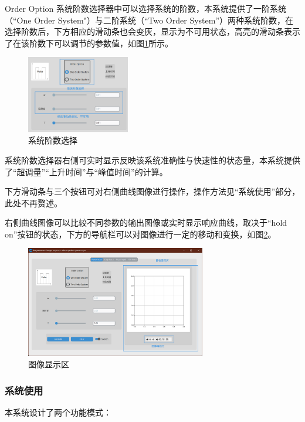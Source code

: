 \documentclass[12pt]{ctexart}
\begin{document}
Order Option 系统阶数选择器中可以选择系统的阶数，本系统提供了一阶系统（“One Order System"）与二阶系统（“Two Order System”）两种系统阶数，在选择阶数后，下方相应的滑动条也会变灰，显示为不可用状态，高亮的滑动条表示了在该阶数下可以调节的参数值，如图\ref{figure5}所示。

\begin{figure}[htbp]
    \centering
    \includegraphics[width=0.4\textwidth]{img/order_option.png}
    \caption{系统阶数选择}\label{figure5}
\end{figure}

系统阶数选择器右侧可实时显示反映该系统准确性与快速性的状态量，本系统提供了“超调量”“上升时间”与“峰值时间”的计算。

下方滑动条与三个按钮可对右侧曲线图像进行操作，操作方法见“系统使用”部分，此处不再赘述。

右侧曲线图像可以比较不同参数的输出图像或实时显示响应曲线，取决于“hold on”按钮的状态，下方的导航栏可以对图像进行一定的移动和变换，如图\ref{figure6}。

\begin{figure}[htbp]
    \centering
    \includegraphics[width=0.7\textwidth]{img/plot_display.png}
    \caption{图像显示区}\label{figure6}
\end{figure}

\subsubsection{系统使用}

本系统设计了两个功能模式：
\end{document}
